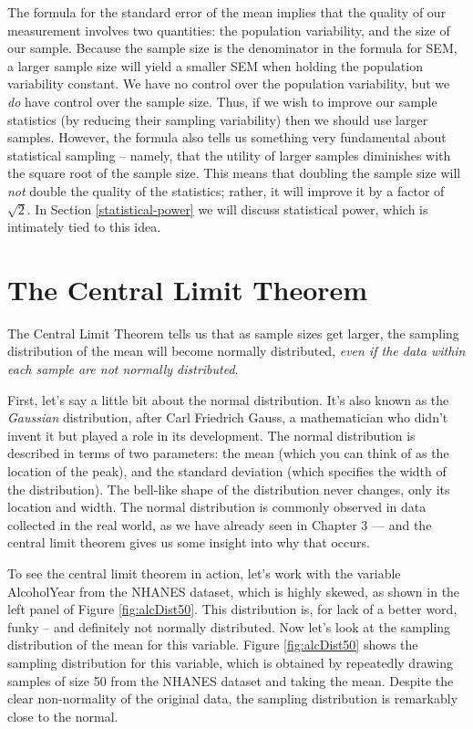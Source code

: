 \documentclass[
  12pt,
]{book}
\begin{document}
The formula for the standard error of the mean implies that the quality of our measurement involves two quantities: the population variability, and the size of our sample. Because the sample size is the denominator in the formula for SEM, a larger sample size will yield a smaller SEM when holding the population variability constant. We have no control over the population variability, but we \emph{do} have control over the sample size. Thus, if we wish to improve our sample statistics (by reducing their sampling variability) then we should use larger samples. However, the formula also tells us something very fundamental about statistical sampling -- namely, that the utility of larger samples diminishes with the square root of the sample size. This means that doubling the sample size will \emph{not} double the quality of the statistics; rather, it will improve it by a factor of \(\sqrt{2}\). In Section \ref{statistical-power} we will discuss statistical power, which is intimately tied to this idea.

\hypertarget{the-central-limit-theorem}{%
\section{The Central Limit Theorem}\label{the-central-limit-theorem}}

The Central Limit Theorem tells us that as sample sizes get larger, the sampling distribution of the mean will become normally distributed, \emph{even if the data within each sample are not normally distributed}.

First, let's say a little bit about the normal distribution. It's also known as the \emph{Gaussian} distribution, after Carl Friedrich Gauss, a mathematician who didn't invent it but played a role in its development. The normal distribution is described in terms of two parameters: the mean (which you can think of as the location of the peak), and the standard deviation (which specifies the width of the distribution). The bell-like shape of the distribution never changes, only its location and width. The normal distribution is commonly observed in data collected in the real world, as we have already seen in Chapter 3 --- and the central limit theorem gives us some insight into why that occurs.

To see the central limit theorem in action, let's work with the variable AlcoholYear from the NHANES dataset, which is highly skewed, as shown in the left panel of Figure \ref{fig:alcDist50}. This distribution is, for lack of a better word, funky -- and definitely not normally distributed. Now let's look at the sampling distribution of the mean for this variable. Figure \ref{fig:alcDist50} shows the sampling distribution for this variable, which is obtained by repeatedly drawing samples of size 50 from the NHANES dataset and taking the mean. Despite the clear non-normality of the original data, the sampling distribution is remarkably close to the normal.
\end{document}
